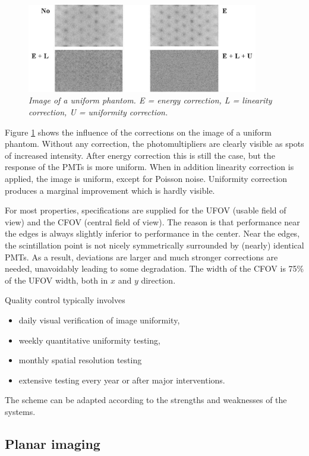 \documentclass[11pt,oneside]{book}
\begin{document}
\begin{figure}[tb]
\centering
\includegraphics[width=0.9\textwidth]{figs/fig_en_lin_unif.pdf}
\caption{\label{fig:en_lin_unif} \emph{Image of a uniform phantom. E = energy
correction, L = linearity correction, U = uniformity correction.}}
\end{figure}
%
Figure \ref{fig:en_lin_unif} shows the influence of the corrections on the
image of a uniform phantom. Without any correction, the photomultipliers are
clearly visible as spots of increased intensity. After energy correction this
is still the case, but the response of the PMTs is more uniform. When in
addition linearity correction is applied, the image is uniform, except for
Poisson noise. Uniformity correction produces a marginal improvement which is
hardly visible.

For most properties, specifications are supplied for the UFOV (usable field of
view) and the CFOV (central field of view). The reason is that performance
near the edges is always slightly inferior to performance in the center. Near
the edges, the scintillation point is not nicely symmetrically surrounded by
(nearly) identical PMTs. As a result, deviations are larger and much stronger
corrections are needed, unavoidably leading to some degradation. The width of
the CFOV is 75\% of the UFOV width, both in $x$ and $y$ direction. 

Quality control typically involves
\begin{itemize}
  \item daily visual verification of image uniformity,
  \item weekly quantitative uniformity testing,
  \item monthly spatial resolution testing
  \item extensive testing every year or after major interventions.
\end{itemize}
The scheme can be adapted according to the strengths and weaknesses of the
systems.


\subsection{Planar imaging}
\end{document}
